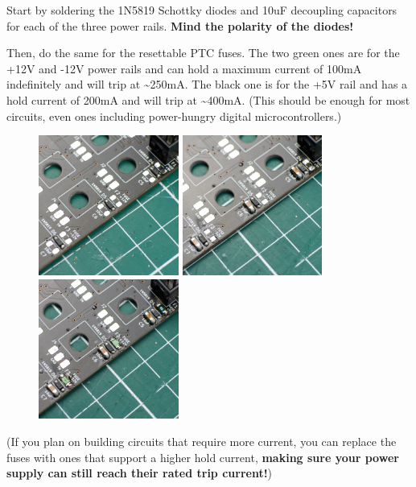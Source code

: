 \documentclass[12pt, a4paper]{article}
\begin{document}
Start by soldering the 1N5819 Schottky diodes and 10uF decoupling capacitors for each of the
three power rails. \textbf{Mind the polarity of the diodes!}

Then, do the same for the resettable PTC fuses. The two green ones are for the +12V and -12V
power rails and can hold a maximum current of 100mA indefinitely and will trip at
\textasciitilde 250mA. The black one is for the +5V rail and has a hold current of 200mA and
will trip at \textasciitilde 400mA. (This should be enough for most circuits, even ones
including power-hungry digital microcontrollers.)

\begin{figure}[H]
    \centering
    \includegraphics[width=46mm]{images/section_1-1_diodes.jpg}
    \hspace{2mm}
    \includegraphics[width=46mm]{images/section_1-1_capacitors.jpg}
    \hspace{2mm}
    \includegraphics[width=46mm]{images/section_1-1_fuses.jpg}
\end{figure}

\begin{quoting}
    \small
    (If you plan on building circuits that require more current, you can replace the fuses with
    ones that support a higher hold current, \textbf{making sure your power supply can still
    reach their rated trip current!})
\end{quoting}
\end{document}
